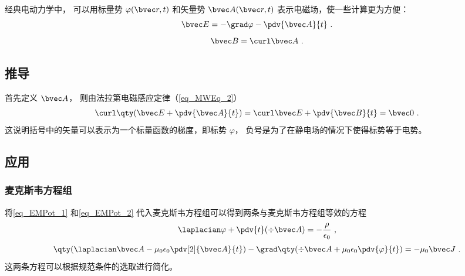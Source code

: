 
\begin{issues}
\issueDraft
\end{issues}


经典电动力学中， 可以用标量势 $\varphi(\bvec r, t)$ 和矢量势 $\bvec A(\bvec r, t)$ 表示电磁场，使一些计算更为方便：
\begin{equation}\label{eq_EMPot_1}
\bvec E = -\grad \varphi - \pdv{\bvec A}{t}~.
\end{equation}
\begin{equation}\label{eq_EMPot_2}
\bvec B = \curl \bvec A~.
\end{equation}

\subsection{推导}
首先定义 $\bvec A$， 则由法拉第电磁感应定律（\autoref{eq_MWEq_2}）
\begin{equation}
\curl \qty(\bvec E + \pdv{\bvec A}{t}) = \curl \bvec E + \pdv{\bvec B}{t} = \bvec 0~.
\end{equation}
这说明括号中的矢量可以表示为一个标量函数的梯度，即标势 $\varphi$， 负号是为了在静电场的情况下使得标势等于电势。
\subsection{应用}
\subsubsection{麦克斯韦方程组}
将\autoref{eq_EMPot_1} 和\autoref{eq_EMPot_2} 代入麦克斯韦方程组可以得到两条与麦克斯韦方程组等效的方程
\begin{equation}\label{eq_EMPot_4}
\laplacian \varphi + \pdv{t} (\div \bvec A) = -\frac{\rho}{\epsilon_0}~,
\end{equation}
\begin{equation}\label{eq_EMPot_5}
\qty(\laplacian \bvec A - \mu_0\epsilon_0 \pdv[2]{\bvec A}{t}) - \grad \qty(\div \bvec A + \mu_0\epsilon_0 \pdv{\varphi}{t}) = -\mu_0\bvec J~.
\end{equation}
这两条方程可以根据规范条件的选取进行简化。
